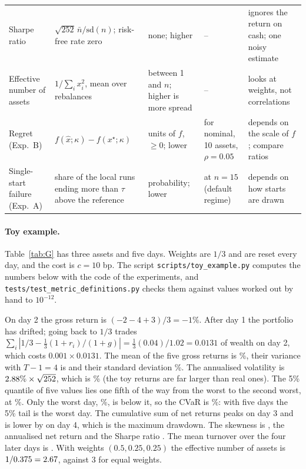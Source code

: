 \documentclass[11pt,a4paper]{article}
\begin{document}
\begin{table}[t]
\begin{tabular}{p{1.8cm}p{4.3cm}p{2.5cm}p{2.1cm}p{3.4cm}}
Sharpe ratio & $\sqrt{252}\,\bar n/\mathrm{sd}(n)$; risk-free rate zero & none; higher & \mSharpeMin{}--\mSharpeMax{} & ignores the return on cash; one noisy estimate\\
Effective number of assets & $1/\sum_ix_i^2$, mean over rebalances & between 1 and $n$; higher is more spread & \mEffNMin{}--\mEffNMax{} & looks at weights, not correlations\\
Regret (Exp.~B) & $f(\hat x;\kappa)-f(x^\star;\kappa)$ & units of $f$, $\ge0$; lower & \bTenANom{} for nominal, 10 assets, $\rho=0.05$ & depends on the scale of $f$; compare ratios\\
Single-start failure (Exp.~A) & share of the \rgStarts{} local runs ending more than $\tau$ above the reference & probability; lower & \aPfDefFifteen{} at $n=15$ (default regime) & depends on how starts are drawn\\
\bottomrule
\end{tabular}
\end{table}

\paragraph{Toy example.}
Table~\ref{tab:G} has three assets and five days.
Weights are $1/3$ and are reset every day, and the cost is $c=10$ bp.
The script \texttt{scripts/toy\_example.py} computes the numbers below with the code of the experiments, and \texttt{tests/test\_metric\_definitions.py} checks them against values worked out by hand to $10^{-12}$.

On day 2 the gross return is $(-2-4+3)/3=-1\%$.
After day 1 the portfolio has drifted; going back to $1/3$ trades $\sum_i|1/3-\tfrac13(1+r_i)/(1+g)|=\tfrac13(0.04)/1.02=0.0131$ of wealth on day 2, which costs $0.001\times0.0131$.
The mean of the five gross returns is \toyMeanG{}\%, their variance with $T-1=4$ is \toyVarG{} and their standard deviation \toySdG{}\%.
The annualised volatility is $2.88{}\%\times\sqrt{252}$, which is \toyVolPct{}\% (the toy returns are far larger than real ones).
The 5\% quantile of five values lies one fifth of the way from the worst to the second worst, at \toyQ{}\%.
Only the worst day, \toyWorst{}\%, is below it, so the CVaR is \toyCvarPct{}\%: with five days the 5\% tail is the worst day.
The cumulative sum of net returns peaks on day 3 and is lower by \toyDd{} on day 4, which is the maximum drawdown.
The skewness is \toySkew{}, the annualised net return \toyRet{} and the Sharpe ratio \toySharpe{}.
The mean turnover over the four later days is \toyTurn{}.
With weights $(0.5,0.25,0.25)$ the effective number of assets is $1/0.375=2.67{}$, against 3 for equal weights.
\end{document}
